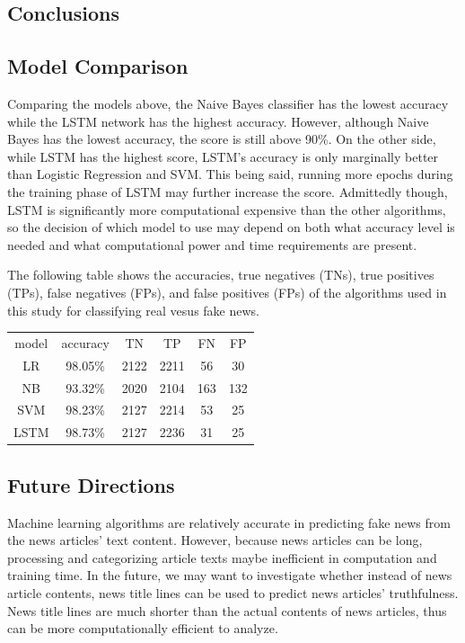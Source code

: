 \documentclass{article}
\begin{document}
\begin{multicols}{2}
\section{Conclusions}

\subsection{Model Comparison}


Comparing the models above, the Naive Bayes classifier has the lowest accuracy while the LSTM network has the highest accuracy. However, although Naive Bayes has the lowest accuracy, the score is still above 90\%. On the other side, while LSTM has the highest score, LSTM's accuracy is only marginally better than Logistic Regression and SVM. This being said, running more epochs during the training phase of LSTM may further increase the score. Admittedly though, LSTM is significantly more computational expensive than the other algorithms, so the decision of which model to use may depend on both what accuracy level is needed and what computational power and time requirements are present. 

The following table shows the accuracies, true negatives (TNs), true positives (TPs), false negatives (FPs), and false positives (FPs) of the algorithms used in this study for classifying real vesus fake news. 


\begin{center}
\begin{tabular}{ c c c c c c}
 model & accuracy & TN & TP & FN & FP \\ 
LR & 98.05\% & 2122  & 2211 & 56 & 30\\ 
NB & 93.32\% & 2020 & 2104 & 163 & 132\\
SVM & 98.23\% & 2127 & 2214 & 53 & 25\\
LSTM & 98.73\% & 2127 & 2236 & 31 & 25 \\
\end{tabular}
\end{center}

\subsection{Future Directions}

Machine learning algorithms are relatively accurate in predicting fake news from the news articles' text content. However, because news articles can be long, processing and categorizing article texts maybe inefficient in computation and training time. In the future, we may want to investigate whether instead of news article contents, news title lines can be used to predict news articles' truthfulness. News title lines are much shorter than the actual contents of news articles, thus can be more computationally efficient to analyze. 





\end{multicols}
\end{document}
